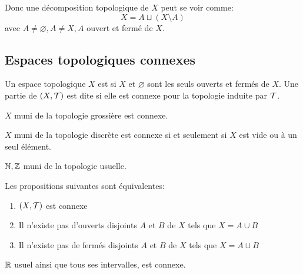 \documentclass[french,a4paper,10pt]{article}
\begin{document}
	\medskip

	Donc une décomposition topologique de $X$ peut se voir comme:
	\[
		X = A\sqcup (X\setminus A)
	\]
	avec $ A\ne\varnothing, A\ne{} X, A$ ouvert et fermé de $X$.

	\subsection{Espaces topologiques connexes}

	\begin{definition}
		Un espace topologique $X$ est  si $X$ et $\varnothing$ sont les seuls ouverts et fermés de $X$.
		Une partie de $ (X,\cal{T} )$ est dite  si elle est connexe pour la topologie induite par $\cal T$.
	\end{definition}

	\begin{example}
		$X$ muni de la topologie grossière est connexe.
	\end{example}

	\begin{example}
		$X$ muni de la topologie discrète est connexe si et seulement si $X$ est vide ou à un seul élément.
	\end{example}

	\begin{example}
		$\mathbb{N}, \mathbb{Z}$ muni de la topologie usuelle.
	\end{example}

	\begin{remark}
		Les propositions suivantes sont équivalentes:
		\begin{enumerate}[label=$(\roman*)$]
			\item $(X,\cal T)$ est connexe
			\item Il n'existe pas d'ouverts disjoints $A$ et $B$ de $X$ tels que $X=A\cup B$
			\item Il n'existe pas de fermés disjoints $A$ et $B$ de $X$ tels que $X=A\sqcup B$
		\end{enumerate}
	\end{remark}

	\begin{theorem}
		$\mathbb{R}$ usuel ainsi que tous ses intervalles, est connexe.
	\end{theorem}
\end{document}
